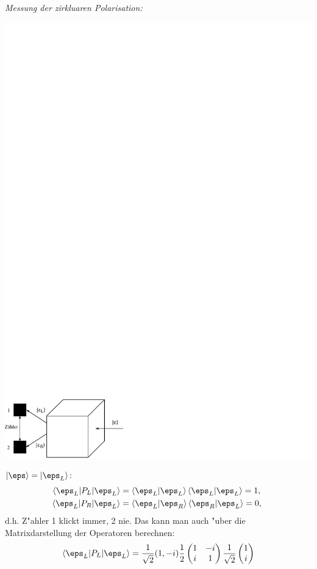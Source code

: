 \documentclass[a4paper]{scrartcl}
\begin{document}
{\emph{Messung der zirkluaren Polarisation:}
\begin{center}
\includegraphics{044MessungZirkPol}
\end{center}
\begin{1aufz}
\item $\ket \eps = \ket{\eps_L}$:
\begin{align*}
\braket{ \eps_L | P_L | \eps_L } & = \braket{\eps_L | \eps_L}\braket{\eps_L | \eps_L} = 1, \\
\braket{ \eps_L | P_R | \eps_L } & = \braket{\eps_L | \eps_R}\braket{\eps_R | \eps_L} = 0, \
\end{align*}
d.h. Z"ahler 1 klickt immer, 2 nie. Das kann man auch "uber die Matrixdarstellung der Operatoren berechnen:
\begin{align*}
\braket{ \eps_L | P_L | \eps_L } & = \frac1{\sqrt2} (1, -i) \frac12 \begin{pmatrix} 1 & -i \\ i & 1 \end{pmatrix} \frac1{\sqrt2} \begin{pmatrix} 1 \\ i \end{pmatrix} \\

\end{align*}
\end{1aufz}}
\end{document}
